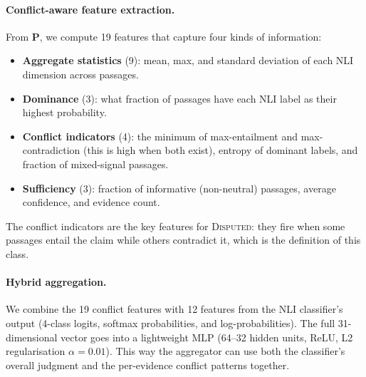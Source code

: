 \documentclass[11pt]{article}
\begin{document}
\paragraph{Conflict-aware feature extraction.}
From $\mathbf{P}$, we compute 19 features that capture four kinds of
information:
\begin{itemize}
  \item \textbf{Aggregate statistics} (9): mean, max, and standard
        deviation of each NLI dimension across passages.
  \item \textbf{Dominance} (3): what fraction of passages have each NLI
        label as their highest probability.
  \item \textbf{Conflict indicators} (4): the minimum of max-entailment
        and max-contradiction (this is high when both exist),
        entropy of dominant labels, and fraction of mixed-signal
        passages.
  \item \textbf{Sufficiency} (3): fraction of informative (non-neutral)
        passages, average confidence, and evidence count.
\end{itemize}

The conflict indicators are the key features for \textsc{Disputed}:
they fire when some passages entail the claim while others contradict
it, which is the definition of this class.

\paragraph{Hybrid aggregation.}
We combine the 19 conflict features with 12 features from the NLI
classifier's output (4-class logits, softmax probabilities, and
log-probabilities).
The full 31-dimensional vector goes into a lightweight MLP (64--32
hidden units, ReLU, L2 regularisation $\alpha = 0.01$).
This way the aggregator can use both the classifier's overall judgment
and the per-evidence conflict patterns together.
\end{document}
